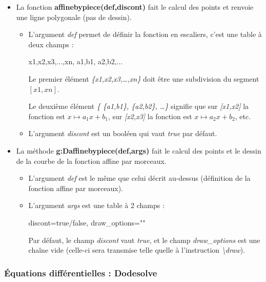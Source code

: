\documentclass[%
10pt,%
a4paper,%
french,%
]%
{article}%
\begin{document}
\begin{itemize}
\item La fonction \textbf{affinebypiece(def,discont)} fait le calcul des points et renvoie une ligne polygonale (pas de dessin).

  \begin{itemize}
  \item  L'argument \emph{def} permet de définir la fonction en escaliers, c'est une table à deux champs :

\begin{TeXcode}
 { {x1,x2,x3,...,xn}, { {a1,b1}, {a2,b2},...} }
\end{TeXcode}

  Le premier élément \emph{\{x1,x2,x3,\ldots,xn\}} doit être une subdivision du segment \([x1,xn]\).
  
  Le deuxième élément \emph{\{ \{a1,b1\}, \{a2,b2\}, \ldots\}} signifie que sur \emph{{[}x1,x2{]}} la fonction est \(x\mapsto a_1x+b_1\), sur \emph{{[}x2,x3{]}} la fonction est
  \(x\mapsto a_2x+b_2\), etc.
  
  \item L'argument \emph{discont} est un booléen qui vaut \emph{true} par défaut.
  \end{itemize}
  
\item La méthode \textbf{g:Daffinebypiece(def,args)} fait le calcul des points et le dessin de la courbe de la fonction affine par morceaux.

  \begin{itemize}
  \item L'argument \emph{def} est le même que celui décrit au-dessus (définition de la fonction affine par morceaux).
  \item L'argument \emph{args} est une table à 2 champs :
  
\begin{TeXcode}
  { discont=true/false, draw_options="" }
\end{TeXcode}

  Par défaut, le champ \emph{discont} vaut \emph{true}, et le champ \emph{draw\_options} est une chaîne vide (celle-ci sera transmise telle quelle à l'instruction \emph{\textbackslash draw}).
  \end{itemize}
\end{itemize}

\subsubsection{Équations différentielles : Dodesolve}
\end{document}
